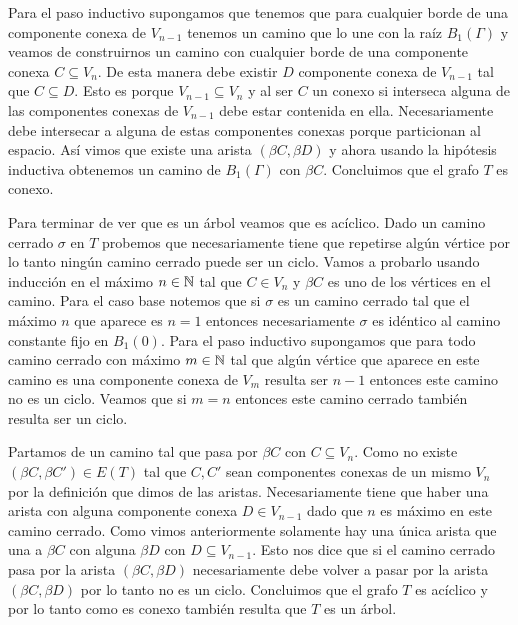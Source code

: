 \documentclass[tesis.tex]{subfiles}
\begin{document}
\begin{ej}
	Para el paso inductivo supongamos que tenemos que para cualquier borde de una componente conexa de $V_{n-1}$ tenemos un camino que lo une con la raíz $B_1(\Gamma)$ y veamos de construirnos un camino con cualquier borde de una componente conexa $C \subseteq V_n$.
	De esta manera debe existir $D$ componente conexa de $V_{n-1}$ tal que $C \subseteq D$. Esto es porque $V_{n-1} \subseteq V_{n}$ y al ser $C$ un conexo si interseca alguna de las componentes conexas de $V_{n-1}$ debe estar contenida en ella. 
	Necesariamente debe intersecar a alguna de estas componentes conexas porque particionan al espacio.
	Así vimos que existe una arista $(\beta C, \beta D)$ y ahora usando la hipótesis inductiva obtenemos un camino de $B_1(\Gamma)$ con $\beta C$.
	Concluimos que el grafo $T$ es conexo.   
	
	Para terminar de ver que es un árbol veamos que es acíclico. 
	Dado un camino cerrado $\sigma$ en $T$ probemos que necesariamente tiene que repetirse algún vértice por lo tanto ningún camino cerrado puede ser un ciclo. Vamos a probarlo usando inducción en el máximo $n \in \mathbb N$ tal que $C \in V_n$ y $\beta C$ es uno de los vértices en el camino. 
	Para el caso base notemos que si $\sigma$ es un camino cerrado tal que el máximo $n$ que aparece es $n=1$ entonces necesariamente $\sigma$ es idéntico al camino constante fijo en $B_1(0)$.
	Para el paso inductivo supongamos que para todo camino cerrado con máximo $m \in \mathbb N$ tal que algún vértice que aparece en este camino es una componente conexa de $V_m$ resulta ser $n-1$ entonces este camino no es un ciclo. Veamos que si $m=n$ entonces este camino cerrado también resulta ser un ciclo.
	
	Partamos de un camino tal que pasa por $\beta C$ con $C \subseteq V_n$. 
	Como no existe $(\beta C, \beta C') \in E(T)$ tal que $C,C'$ sean componentes conexas de un mismo $V_n$ por la definición que dimos de las aristas. Necesariamente tiene que haber una arista con alguna componente conexa $D \in V_{n-1}$ dado que $n$ es máximo en este camino cerrado.   
	Como vimos anteriormente solamente hay una única arista que una a $\beta C$ con alguna $\beta D$ con $D \subseteq V_{n-1}$. 
	Esto nos dice que si el camino cerrado pasa por la arista $(\beta C, \beta D)$ necesariamente debe volver a pasar por la arista $(\beta C, \beta D)$ por lo tanto no es un ciclo. 
	Concluimos que el grafo $T$ es acíclico y por lo tanto como es conexo también resulta que $T$ es un árbol.
	

\end{ej}
\end{document}
